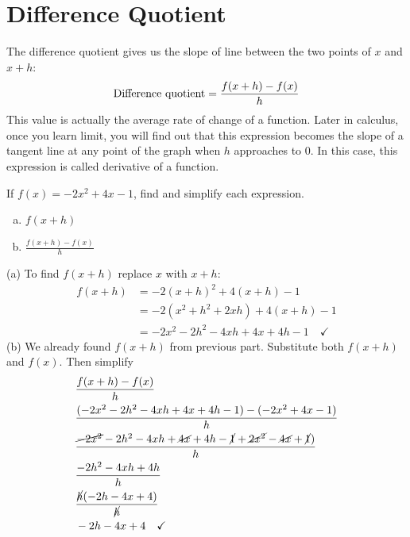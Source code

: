 \section{Difference Quotient}
The difference quotient gives us the slope of line between the  two points of $x$ and $x+h$:
\begin{equation}
        \text{Difference quotient}=\frac{f(x+h)-f(x)}{h}\\
        \label{diff_quotient}
\end{equation}
This value is actually the average rate of change of a function. Later in calculus, once you learn limit, you will find out that this expression becomes the slope of a tangent line at any point of the graph when $h$ approaches to $0$. In this case, this expression is called derivative of a function.
\begin{exa}
    If $f(x) =-2x^2+4x-1$, find and simplify each expression.
    \begin{multicols}{2}
        \begin{enumerate}[(a)]
            \item $f(x+h)$
            \item $\frac{f(x+h)-f(x)}{h}$
        \end{enumerate}
    \end{multicols}
\end{exa}
(a) To find $f(x+h)$ replace $x$ with $x+h$:
\begin{align*}
        f(x+h) &= -2(x+h)^2+4(x+h)-1 \\
        &=-2(x^2+h^2+2xh)+4(x+h)-1\\
        &=-2x^2-2h^2-4xh+4x+4h-1 \quad \checkmark
\end{align*}
(b) We already found $f(x+h)$ from previous part. Substitute both $f(x+h)$ and $f(x)$. Then simplify
\begin{align*}
    &\frac{f(x+h)-f(x)}{h} \\
    &\frac{(-2x^2-2h^2-4xh+4x+4h-1) - (-2x^2+4x-1) }{h}\\
    &\frac{\cancel{-2x^2}-2h^2-4xh+\cancel{4x}+4h-\cancel{1} +\cancel{2x^2}-\cancel{4x}+\cancel{1}) }{h}\\
    &\frac{-2h^2-4xh+4h}{h}\\
    &\frac{\cancel{h}(-2h-4x+4)}{\cancel{h}}\\
    &-2h-4x+4\quad \checkmark
\end{align*}
